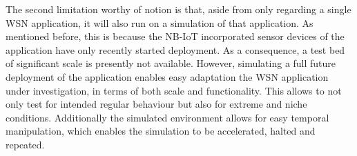 The second limitation worthy of notion is that, aside from only regarding a single WSN application, it will also run on a simulation of that application. As mentioned before, this is because the NB-IoT incorporated sensor devices of the \sensit application have only recently started deployment. As a consequence, a test bed of significant scale is presently not available. However, simulating a full future deployment of the application enables easy adaptation the WSN application under investigation, in terms of both scale and functionality. This allows to not only test for intended regular behaviour but also for extreme and niche conditions. Additionally the simulated environment allows for easy temporal manipulation, which enables the simulation to be accelerated, halted and repeated.



